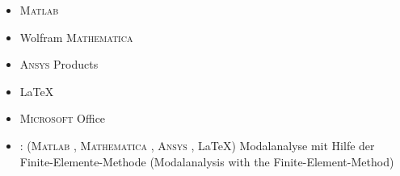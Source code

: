 \documentclass[zh]{resume}
\newcommand{\Matlab}{\textsc{Matlab}\textsuperscript{\textregistered} }
\newcommand{\Ansys}{\textsc{Ansys}\textsuperscript{\textregistered} }
\newcommand{\Mathematica}{\textsc{Mathematica}\textsuperscript{\textregistered} }
\newcommand{\Microsoft}{\textsc{Microsoft}\textsuperscript{\textregistered} }
\begin{document}
\begin{itemize}
  \item \Matlab
 
  \item Wolfram \Mathematica
  
  \item \Ansys Products
  
  \item \LaTeX
  
  \item \Microsoft Office
\end{itemize}

\begin{itemize}
  \item {}: (\Matlab, \Mathematica, \Ansys, \LaTeX)
  		Modalanalyse mit Hilfe der Finite-Elemente-Methode (Modalanalysis with the Finite-Element-Method) \\
\end{itemize}

%
\end{document}
